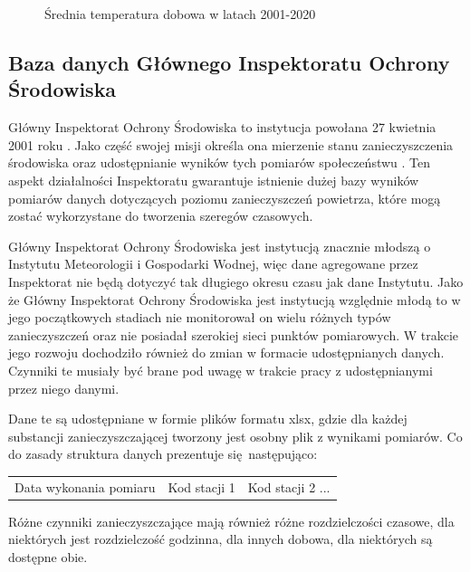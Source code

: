 \documentclass[10pt,a4paper]{article}
\begin{document}
\begin{figure}[!ht]
	\centering
	\caption{Średnia temperatura dobowa w latach 2001-2020}
	\label{figure:imgw}
\end{figure}
\FloatBarrier

\subsection{Baza danych Głównego Inspektoratu Ochrony Środowiska}
Główny Inspektorat Ochrony Środowiska to instytucja powołana 27 kwietnia 2001 roku \cite{giosStart}. Jako część swojej misji określa ona mierzenie stanu zanieczyszczenia środowiska oraz udostępnianie wyników tych pomiarów społeczeństwu \cite{giosMission}. Ten aspekt działalności Inspektoratu gwarantuje istnienie dużej bazy wyników pomiarów danych dotyczących poziomu zanieczyszczeń powietrza, które mogą zostać wykorzystane do tworzenia szeregów czasowych. 

Główny Inspektorat Ochrony Środowiska jest instytucją znacznie młodszą o Instytutu Meteorologii i Gospodarki Wodnej, więc dane agregowane przez Inspektorat nie będą dotyczyć tak długiego okresu czasu jak dane Instytutu. Jako że Główny Inspektorat Ochrony Środowiska jest instytucją względnie młodą to w jego początkowych stadiach nie monitorował on wielu różnych typów zanieczyszczeń oraz nie posiadał szerokiej sieci punktów pomiarowych. W trakcie jego rozwoju dochodziło również do zmian w formacie udostępnianych danych. Czynniki te musiały być brane pod uwagę w trakcie pracy z udostępnianymi przez niego danymi. 

Dane te są udostępniane w formie plików formatu xlsx, gdzie dla każdej substancji zanieczyszczającej tworzony jest osobny plik z wynikami pomiarów. Co do zasady struktura danych prezentuje się następująco:
\begin{center}
	\begin{tabular}{|c|c|c}
		Data wykonania pomiaru & Kod stacji 1 & Kod stacji 2 ...
	\end{tabular}
\end{center}
Różne czynniki zanieczyszczające mają również różne rozdzielczości czasowe, dla niektórych jest rozdzielczość godzinna, dla innych dobowa, dla niektórych są dostępne obie. 
\end{document}
